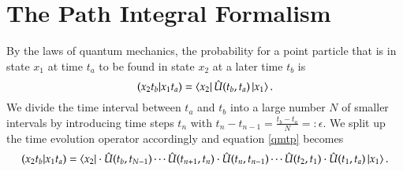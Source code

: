 \section{The Path Integral Formalism}

By the laws of quantum mechanics, the probability for a point particle that is in state $x_1$ at time $t_a$ to be found in state $x_2$ at a later time $t_b$ is
\begin{equation} \label{qmtp}
  (x_2 t_b | x_1 t_a) = \bra{x_2}\hat{U}(t_b,t_a)\ket{x_1}.
\end{equation}
We divide the time interval between $t_a$ and $t_b$ into a large number $N$ of smaller intervals by introducing time steps $t_n$ with $t_n -t_{n-1} = \frac{t_b - t_a}{N} =:\epsilon$. We split up the time evolution operator accordingly and equation \ref{qmtp} becomes
\begin{equation} \label{qmtpn}
  (x_2 t_b | x_1 t_a) = \bra{x_2}\cdot\hat{U}(t_b,t_{N-1}) \cdots \hat{U}(t_{n+1},t_n)\cdot\hat{U}(t_n,t_{n-1}) \cdots \hat{U}(t_2,t_1)\cdot\hat{U}(t_1,t_a)\ket{x_1}.
\end{equation}

